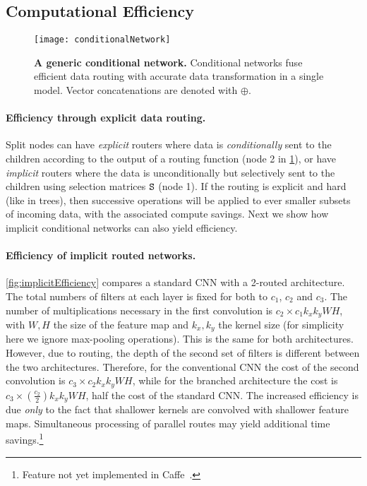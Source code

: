 \documentclass[thesis]{subfiles}
\begin{document}
	\subsection{Computational Efficiency}\label{sec:efficiency}
	
	\begin{figure}[tbp]
	\centerline{
	\texttt{[image: conditionalNetwork]}
	}
	   \caption[A generic conditional network]{{\bf A generic conditional network.} 
	   Conditional networks fuse efficient data routing with accurate data transformation in a single model. 
	   Vector concatenations are denoted with $\oplus$.}
	\label{fig:conditionalNetwork}
	\end{figure}
	
	\paragraph{Efficiency through explicit data routing.}
	Split nodes can have {\em explicit} routers where data is {\em conditionally} sent to the children according to the output of a routing function (\eg node 2 in \cref{fig:conditionalNetwork}),
	or have \emph{implicit} routers where the data is unconditionally but selectively sent to the children using selection matrices $\mat S$ (\eg node 1).
	If the routing is explicit and hard (like in trees), then successive operations will be applied to ever smaller subsets of incoming data, with the associated compute savings. 
	Next we show how implicit conditional networks can also yield efficiency. 
	
	\paragraph{Efficiency of implicit routed networks.}
	\cref{fig:implicitEfficiency} compares a standard CNN with a 2-routed
	architecture. The total numbers of filters at each layer is fixed for 
	both to $c_1$, $c_2$ and $c_3$.
	The number of multiplications necessary in the first convolution is 
	$c_2 \times c_1 k_x k_y W H$, with $W, H$ the size of the feature 
	map and $k_x, k_y$ the kernel size (for simplicity here we ignore max-pooling operations).
	This is the same for both architectures.
	However, due to routing, the depth of the second set of filters is different between the two architectures.
	Therefore, for the conventional CNN the cost of the second convolution is 
	$c_3 \times c_2 k_x k_y W H$, while for the branched architecture 
	the cost is $c_3 \times \left( \frac{c_2}{2}\right) k_x k_y W H$, \ie half the cost of the standard CNN. 
	The increased efficiency is due {\em only} to the fact that shallower kernels are convolved with shallower feature maps. 
	Simultaneous processing of parallel routes may yield additional 
	time savings.\footnote{Feature not yet implemented in Caffe~\cite{Jia2014}.}
	
\end{document}
